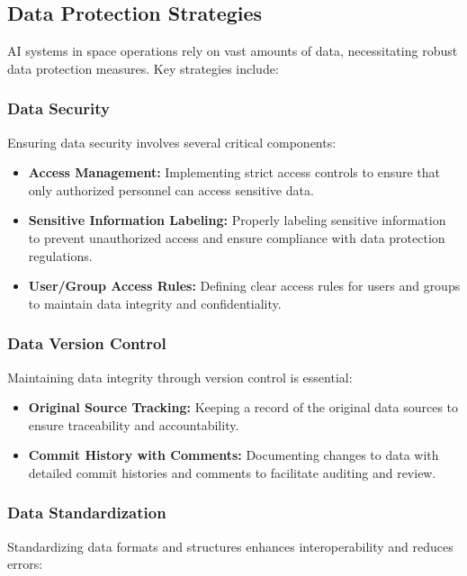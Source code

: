 \documentclass[a4paper,12pt]{article}
\begin{document}
\subsection{Data Protection Strategies}

AI systems in space operations rely on vast amounts of data, necessitating robust data protection measures. Key strategies include:

\subsubsection{Data Security}

Ensuring data security involves several critical components:

\begin{itemize}
    \item \textbf{Access Management:} Implementing strict access controls to ensure that only authorized personnel can access sensitive data.
    \item \textbf{Sensitive Information Labeling:} Properly labeling sensitive information to prevent unauthorized access and ensure compliance with data protection regulations.
    \item \textbf{User/Group Access Rules:} Defining clear access rules for users and groups to maintain data integrity and confidentiality.
\end{itemize}

\subsubsection{Data Version Control}

Maintaining data integrity through version control is essential:

\begin{itemize}
    \item \textbf{Original Source Tracking:} Keeping a record of the original data sources to ensure traceability and accountability.
    \item \textbf{Commit History with Comments:} Documenting changes to data with detailed commit histories and comments to facilitate auditing and review.
\end{itemize}

\subsubsection{Data Standardization}

Standardizing data formats and structures enhances interoperability and reduces errors:
\end{document}
